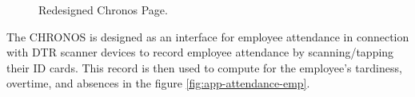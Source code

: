     \begin{figure}[H]
        \centering
        \caption{Redesigned Chronos Page.}
        \label{fig:app-chronos}
    \end{figure}

    The CHRONOS is designed as an interface for employee attendance in connection with DTR scanner devices to record employee attendance by scanning/tapping their ID cards. This record is then used to compute for the employee's tardiness, overtime, and absences in the figure \ref*{fig:app-attendance-emp}.